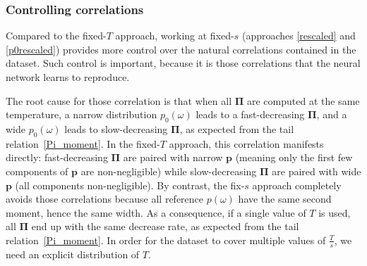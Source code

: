 \documentclass[notitlepage, 11pt, nofootinbib]{revtex4-1}
\renewcommand{\vec}[1]{\bm{#1}}
\begin{document}
\subsubsection{Controlling correlations}
Compared to the fixed-$T$ approach, working at fixed-$s$ (approaches \ref{rescaled} and \ref{p0rescaled}) provides more control over the natural correlations contained in the dataset. Such control is important, because it is those correlations that the neural network learns to reproduce.

The root cause for those correlation is that when all $\vec \Pi$ are computed at the same temperature, a narrow distribution $p_0(\omega)$ leads to a fast-decreasing $\vec \Pi$, and a wide $p_0(\omega)$ leads to slow-decreasing $\vec \Pi$, as expected from the tail relation~\eqref{Pi_moment}.
In the fixed-$T$ approach, this correlation manifests directly: fast-decreasing $\vec \Pi$ are paired with narrow $\vec p$ (meaning only the first few components of $\vec p$ are non-negligible) while slow-decreasing $\vec \Pi$ are paired with wide $\vec p$ (all components non-negligible).
By contrast, the fix-$s$ approach completely avoids those correlations because all reference $p(\omega)$ have the same second moment, hence the same width. As a consequence, if a single value of $T$ is used, all $\vec \Pi$ end up with the same decrease rate, as expected from the tail relation~\eqref{Pi_moment}. In order for the dataset to cover multiple values of $\frac{T}{s}$, we need an explicit distribution of $T$.
\end{document}
